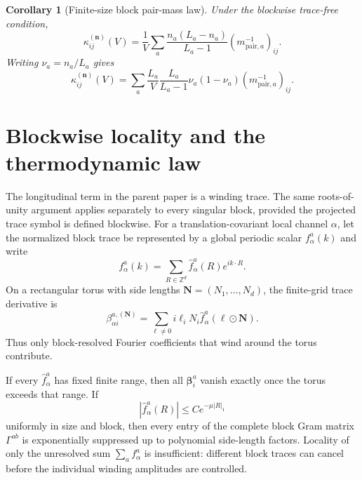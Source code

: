 \documentclass[11pt]{article}
\numberwithin{equation}{section}
\newtheorem{corollary}[theorem]{Corollary}
\newcommand{\bn}{\mathbf n}
\newcommand{\bbeta}{\boldsymbol\beta}
\begin{document}
\begin{corollary}[Finite-size block pair-mass law]
\label{cor:mass-law}
Under the blockwise trace-free condition,
\begin{equation}
 \boxed{
 \kappa_{ij}^{(\bn)}(V)
 =\frac1V\sum_a
 \frac{n_a(L_a-n_a)}{L_a-1}
 (m_{\mathrm{pair},a}^{-1})_{ij}.}
 \label{eq:finite-mass-law}
\end{equation}
Writing $\nu_a=n_a/L_a$ gives
\begin{equation}
 \kappa_{ij}^{(\bn)}(V)
 =\sum_a\frac{L_a}{V}\frac{L_a}{L_a-1}
 \nu_a(1-\nu_a)(m_{\mathrm{pair},a}^{-1})_{ij}.
 \label{eq:finite-mass-law-nu}
\end{equation}
\end{corollary}

\section{Blockwise locality and the thermodynamic law}

The longitudinal term in the parent paper is a winding trace.  The same roots-of-unity argument applies separately to every singular block, provided the projected trace symbol is defined blockwise.  For a translation-covariant local channel $\alpha$, let the normalized block trace be represented by a global periodic scalar $f_\alpha^a(k)$ and write
\begin{equation}
 f_\alpha^a(k)=\sum_{R\in\mathbb Z^d}\widehat f_\alpha^a(R)e^{ik\cdot R}.
 \label{eq:block-symbol-fourier}
\end{equation}
On a rectangular torus with side lengths $\mathbf N=(N_1,\ldots,N_d)$, the finite-grid trace derivative is
\begin{equation}
 \beta_{\alpha i}^{a,(\mathbf N)}
 =\sum_{\ell\ne0}
 i\ell_iN_i\widehat f_\alpha^a(\ell\odot\mathbf N).
 \label{eq:block-winding}
\end{equation}
Thus only block-resolved Fourier coefficients that wind around the torus contribute.

If every $\widehat f_\alpha^a$ has fixed finite range, then all $\bbeta_i^a$ vanish exactly once the torus exceeds that range.  If
\begin{equation}
 |\widehat f_\alpha^a(R)|\le C e^{-\mu|R|_1}
 \label{eq:block-exp-local}
\end{equation}
uniformly in size and block, then every entry of the complete block Gram matrix $\Gamma^{ab}$ is exponentially suppressed up to polynomial side-length factors.  Locality of only the unresolved sum $\sum_af_\alpha^a$ is insufficient: different block traces can cancel before the individual winding amplitudes are controlled.
\end{document}
